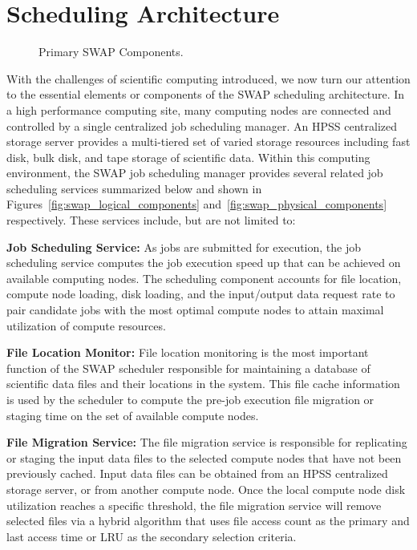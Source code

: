 \section {Scheduling Architecture}\label{sec:background}
%
\begin{figure*}[tb]
	\centering
	\caption{Primary SWAP Components.}
	\label{fig:swap_components}
\end{figure*}

With the challenges of scientific computing introduced, we now turn our attention to the essential elements or components of the SWAP scheduling architecture.  In a high performance computing site, many computing nodes are connected and controlled by a single centralized job scheduling manager.  An HPSS centralized storage server provides a multi-tiered set of varied storage resources including fast disk, bulk disk, and tape storage of scientific data.  Within this computing environment, the SWAP job scheduling manager provides several related job scheduling services summarized below and shown in Figures~\ref{fig:swap_logical_components} and~\ref{fig:swap_physical_components} respectively.
These services include, but are not limited to:

	\noindent\textbf{Job Scheduling Service:}
	As jobs are submitted for execution, the job scheduling service computes the job
    execution speed up that can be achieved on available computing nodes.  The scheduling component accounts for file location, compute node loading, disk loading, and the input/output data request rate to pair candidate jobs with the most optimal compute nodes to attain maximal utilization of compute resources.
	
	\noindent \textbf{File Location Monitor:}
	File location monitoring is the most important function of the SWAP scheduler
    responsible for maintaining a database of scientific data files and their locations in the system.  This file cache information is used by the scheduler to compute the pre-job execution file migration or staging time on the set of available compute nodes.
	
	\noindent\textbf{File Migration Service:}
	The file migration service is responsible for replicating or staging the input data
    files to the selected compute nodes that have not been previously cached.  Input data files can be obtained from an HPSS centralized storage server, or from another compute node.  Once the local compute node disk utilization reaches a specific threshold, the file migration service will remove selected files via a hybrid algorithm that uses file access count as the primary and last access time or LRU as the secondary selection criteria.
	
